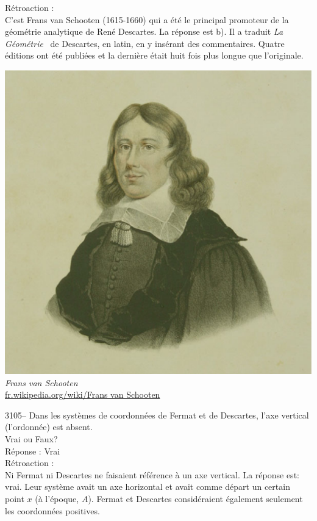 \documentclass[letterpaper, 12pt]{article}
\begin{document}
R\'etroaction :\\
C'est Frans van Schooten (1615-1660) qui a \'et\'e le principal promoteur de la g\'eom\'etrie analytique de Ren\'e Descartes. La r\'eponse est b). Il a traduit \og \emph{La G\'eom\'etrie} \fg \ de Descartes, en latin, en y ins\'erant des commentaires. Quatre \'editions ont \'et\'e publi\'ees et la derni\`ere \'etait huit fois plus longue que l'originale.
\begin{center}
\includegraphics[scale=0.2]{van_schooten.eps}\\
\emph{{\small Frans van Schooten}}\\
\href{http://fr.wikipedia.org/wiki/Frans_van_Schooten}{fr.wikipedia.org/wiki/Frans van Schooten}\\[5mm]
\end{center}



3105-- Dans les syst\`emes de coordonn\'ees de Fermat et de Descartes, l'axe vertical (l'ordonn\'ee) est absent.\\
Vrai ou Faux?\\

R\'eponse : Vrai\\

R\'etroaction :\\
Ni Fermat ni Descartes ne faisaient r\'ef\'erence \`a un axe vertical. La r\'eponse est: vrai. Leur syst\`eme avait un axe horizontal et avait comme d\'epart un certain point $x$ (\`a l'\'epoque, $A$). Fermat et Descartes consid\'eraient \'egalement seulement les coordonn\'ees positives.\\
\end{document}
